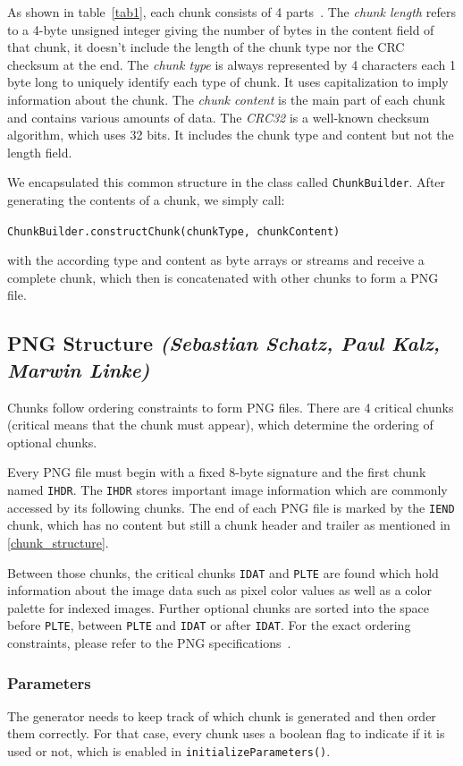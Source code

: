 \documentclass[runningheads]{llncs}
\begin{document}
As shown in table~\ref{tab1}, each chunk consists of 4 parts~\cite{libpng_file_structure}. 
The \textit{chunk length} refers to a 4-byte unsigned integer giving the number of bytes in the content field of that chunk, it doesn't include the length of the chunk type nor the CRC checksum at the end.
The \textit{chunk type} is always represented by 4 characters each 1 byte long to uniquely identify each type of chunk. It uses capitalization to imply information about the chunk.
The \textit{chunk content} is the main part of each chunk and contains various amounts of data.
The \textit{CRC32} is a well-known checksum algorithm, which uses 32 bits. It includes the chunk type and content but not the length field.

We encapsulated this common structure in the class called \texttt{ChunkBuilder}. After generating the contents of a chunk, we simply call: 
\begin{center}
\texttt{ChunkBuilder.constructChunk(chunkType, chunkContent)} 
\end{center}
with the according type and content as byte arrays or streams and receive a complete chunk, which then is concatenated with other chunks to form a PNG file. 

\subsection{PNG Structure \normalfont\textit{(Sebastian Schatz, Paul Kalz, Marwin Linke)}}
Chunks follow ordering constraints to form PNG files. There are 4 critical chunks (critical means that the chunk must appear), which determine the ordering of optional chunks. 

Every PNG file must begin with a fixed 8-byte signature and the first chunk named \texttt{IHDR}. The \texttt{IHDR} stores important image information which are commonly accessed by its following chunks.
The end of each PNG file is marked by the \texttt{IEND} chunk, which has no content but still a chunk header and trailer as mentioned in \ref{chunk_structure}.

Between those chunks, the critical chunks \texttt{IDAT} and \texttt{PLTE} are found which hold information about the image data such as pixel color values as well as a color palette for indexed images. 
Further optional chunks are sorted into the space before \texttt{PLTE}, between \texttt{PLTE} and \texttt{IDAT} or after \texttt{IDAT}. 
For the exact ordering constraints, please refer to the PNG specifications~\cite{libpng_chunks}.
\subsubsection{Parameters}
The generator needs to keep track of which chunk is generated and then order them correctly. For that case, every chunk uses a boolean flag to indicate if it is used or not, which is enabled in \texttt{initializeParameters()}.
\end{document}

